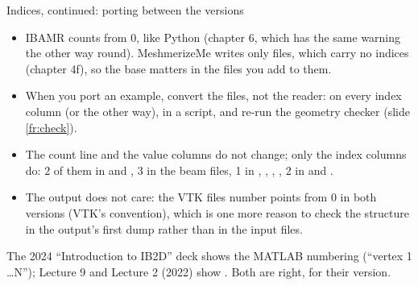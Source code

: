 \documentclass[aspectratio=169,11pt]{beamer}
\begin{document}
\begin{frame}{Indices, continued: porting between the versions}
\label{fr:index2}
\small
\begin{itemize}
  \item IBAMR counts from 0, like Python (chapter 6, which has the same warning the other way round). MeshmerizeMe writes only  files, which carry no indices (chapter 4f), so the base matters in the files you add to them.
  \item When you port an example, convert the files, not the reader:  on every index column (or  the other way), in a script, and re-run the geometry checker (slide \ref{fr:check}).
  \item The count line and the value columns do not change; only the index columns do: 2 of them in  and , 3 in the beam files, 1 in , , , , 2 in  and .
  \item The output does not care: the VTK files number points from 0 in both versions (VTK's convention), which is one more reason to check the structure in the output's first dump rather than in the input files.
\end{itemize}
\begin{punchbox}
\small The 2024 ``Introduction to IB2D'' deck shows the MATLAB numbering (``vertex 1 \ldots N''); Lecture 9 and Lecture 2 (2022) show . Both are right, for their version.
\end{punchbox}
\end{frame}
\end{document}
